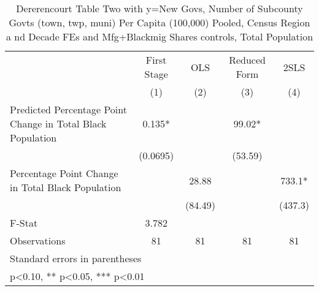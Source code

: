 \begin{table}[htbp]\centering
\def\sym#1{\ifmmode^{#1}\else\(^{#1}\)\fi}
\caption{Dererencourt Table Two with y=New Govs, Number of Subcounty Govts (town, twp, muni) Per Capita (100,000) Pooled, Census Region a nd Decade FEs and Mfg+Blackmig Shares controls, Total Population}
\begin{tabular}{l*{4}{c}}
\toprule
                    & First Stage   &         OLS   &Reduced Form   &        2SLS   \\
                    &\multicolumn{1}{c}{(1)}   &\multicolumn{1}{c}{(2)}   &\multicolumn{1}{c}{(3)}   &\multicolumn{1}{c}{(4)}   \\
\midrule
Predicted Percentage Point Change in Total Black Population&       0.135*  &               &       99.02*  &               \\
                    &    (0.0695)   &               &     (53.59)   &               \\
\addlinespace
Percentage Point Change in Total Black Population&               &       28.88   &               &       733.1*  \\
                    &               &     (84.49)   &               &     (437.3)   \\
\midrule
F-Stat              &       3.782   &               &               &               \\
Observations        &          81   &          81   &          81   &          81   \\
\bottomrule
\multicolumn{5}{l}{\footnotesize Standard errors in parentheses}\\
\multicolumn{5}{l}{\footnotesize * p<0.10, ** p<0.05, *** p<0.01}\\
\end{tabular}
\end{table}
